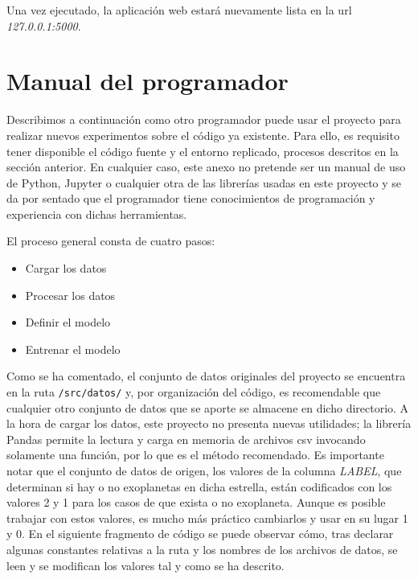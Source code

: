 Una vez ejecutado, la aplicación web estará nuevamente lista en la url \textit{127.0.0.1:5000}.

\section{Manual del programador}

Describimos a continuación como otro programador puede usar el proyecto para realizar nuevos experimentos sobre el código ya existente. Para ello, es requisito tener disponible el código fuente y el entorno replicado, procesos descritos en la sección anterior. En cualquier caso, este anexo no pretende ser un manual de uso de Python, Jupyter o cualquier otra de las librerías usadas en este proyecto y se da por sentado que el programador tiene conocimientos de programación y experiencia con dichas herramientas.

El proceso general consta de cuatro pasos:

\begin{itemize}
    \item Cargar los datos
    \item Procesar los datos
    \item Definir el modelo
    \item Entrenar el modelo
\end{itemize}

Como se ha comentado, el conjunto de datos originales del proyecto se encuentra en la ruta \texttt{/src/datos/} y, por organización del código, es recomendable que cualquier otro conjunto de datos que se aporte se almacene en dicho directorio. A la hora de cargar los datos, este proyecto no presenta nuevas utilidades; la librería Pandas permite la lectura y carga en memoria de archivos csv invocando solamente una función, por lo que es el método recomendado. Es importante notar que el conjunto de datos de origen, los valores de la columna \textit{LABEL}, que determinan si hay o no exoplanetas en dicha estrella, están codificados con los valores 2 y 1 para los casos de que exista o no exoplaneta. Aunque es posible trabajar con estos valores, es mucho más práctico cambiarlos y usar en su lugar 1 y 0. En el siguiente fragmento de código se puede observar cómo, tras declarar algunas constantes relativas a la ruta y los nombres de los archivos de datos, se leen y se modifican los valores tal y como se ha descrito.


